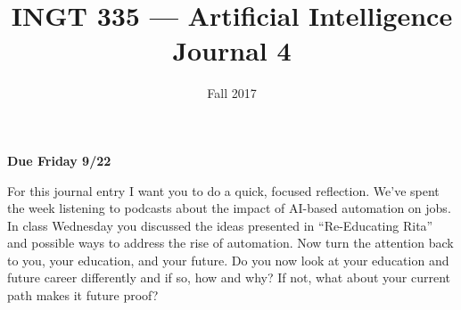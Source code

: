 \documentclass[nobib]{tufte-handout}
\title{INGT 335 --- Artificial Intelligence \\ Journal 4}
\author{}
\date{ Fall 2017 }
\begin{document}
\maketitle

\begin{center}
  \textbf{Due Friday 9/22}
\end{center}

For this journal entry I want you to do a quick, focused reflection. We've spent the week listening to podcasts about the impact of AI-based automation on jobs.  In class Wednesday you discussed the ideas presented in ``Re-Educating Rita'' and possible ways to address the rise of automation.  Now turn the attention back to you, your education, and your future. Do you now look at your education and future career differently and if so, how and why? If not, what about your current path makes it future proof?
\end{document}
